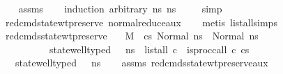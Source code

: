 \begin{isabellebody}
%
\isadelimproof
\ \ %
\endisadelimproof
%
\isatagproof
{}\isamarkupfalse%
\ assms\isanewline
\ \ \isamarkupfalse%
\ {\isacharparenleft}{\kern0pt}induction\ arbitrary{\isacharcolon}{\kern0pt}\ ns\ ns{\isacharprime}{\kern0pt}{\isacharparenright}{\kern0pt}\isanewline
\ \ \ \isamarkupfalse%
\ simp\isanewline
\ \ \isamarkupfalse%
\ red{\isacharunderscore}{\kern0pt}cmd{\isacharunderscore}{\kern0pt}state{\isacharunderscore}{\kern0pt}wt{\isacharunderscore}{\kern0pt}preserve\ normal{\isacharunderscore}{\kern0pt}reduce{\isacharunderscore}{\kern0pt}aux\isanewline
\ \ \isamarkupfalse%
\ {\isacharparenleft}{\kern0pt}metis\ list{\isacharunderscore}{\kern0pt}all{\isacharunderscore}{\kern0pt}simps{\isacharparenleft}{\kern0pt}{}{\isacharparenright}{\kern0pt}{\isacharparenright}{\kern0pt}%
\endisatagproof
{\isafoldproof}%
%
\isadelimproof
\isanewline
%
\endisadelimproof
\isanewline
{}\isamarkupfalse%
\ red{\isacharunderscore}{\kern0pt}cmds{\isacharunderscore}{\kern0pt}state{\isacharunderscore}{\kern0pt}wt{\isacharunderscore}{\kern0pt}preserve{\isacharcolon}{\kern0pt}\isanewline
\ \ \ {\isachardoublequoteopen}M{\isacharcomma}{\kern0pt}{\isasymLambda}{\isacharcomma}{\kern0pt}{\isasymGamma}{\isacharcomma}{\kern0pt}{\isasymOmega}\ {\isasymturnstile}\ {\isasymlangle}cs{\isacharcomma}{\kern0pt}\ Normal\ ns{\isasymrangle}\ {\isacharbrackleft}{\kern0pt}{\isasymrightarrow}{\isacharbrackright}{\kern0pt}\ Normal\ ns{\isacharprime}{\kern0pt}{\isachardoublequoteclose}\isanewline
\ \ \ \ \ \ \ \ \ \ {\isachardoublequoteopen}state{\isacharunderscore}{\kern0pt}well{\isacharunderscore}{\kern0pt}typed\ {\isasymLambda}\ {\isasymOmega}\ ns{\isachardoublequoteclose}\ \ {\isachardoublequoteopen}list{\isacharunderscore}{\kern0pt}all\ {\isacharparenleft}{\kern0pt}{\isasymlambda}c{\isachardot}{\kern0pt}\ {\isasymnot}\ {\isacharparenleft}{\kern0pt}is{\isacharunderscore}{\kern0pt}proc{\isacharunderscore}{\kern0pt}call\ c{\isacharparenright}{\kern0pt}{\isacharparenright}{\kern0pt}\ cs{\isachardoublequoteclose}\isanewline
\ \ \ {\isachardoublequoteopen}state{\isacharunderscore}{\kern0pt}well{\isacharunderscore}{\kern0pt}typed\ {\isasymLambda}\ {\isasymOmega}\ ns{\isacharprime}{\kern0pt}{\isachardoublequoteclose}\isanewline
%
\isadelimproof
\ \ %
\endisadelimproof
%
\isatagproof
{}\isamarkupfalse%
\ assms\ red{\isacharunderscore}{\kern0pt}cmds{\isacharunderscore}{\kern0pt}state{\isacharunderscore}{\kern0pt}wt{\isacharunderscore}{\kern0pt}preserve{\isacharunderscore}{\kern0pt}aux\isanewline

\end{isabellebody}
